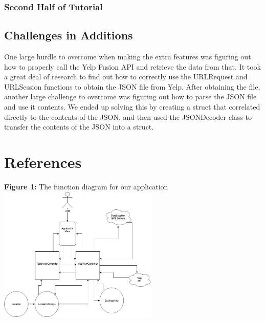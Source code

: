 \documentclass[conference]{IEEEtran}
\begin{document}
\subsubsection{Second Half of Tutorial}


\subsection{Challenges in Additions}
One large hurdle to overcome when making the extra features was figuring out how
to properly call the Yelp Fusion API and retrieve the data from that. It took a 
great deal of research to find out how to correctly use the URLRequest and URLSession
functions to obtain the JSON file from Yelp. After obtaining the file, another large
challenge to overcome was figuring out how to parse the JSON file and use it contents.
We ended up solving this by creating a struct that correlated directly to the contents
of the JSON, and then used the JSONDecoder class to transfer the contents of the 
JSON into a struct.

\section{References}
\textbf{Figure 1:} The function diagram for our application\\
\includegraphics[width=3in]{Midterm1_Function_Diagram.png}
\end{document}
